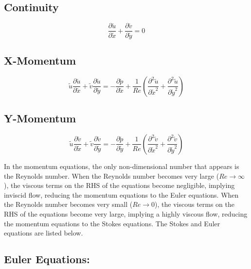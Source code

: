 \documentclass[11pt]{article}
\begin{document}
\subsection*{Continuity}
\begin{equation*}
    \frac{\partial \tilde{u}}{\partial \tilde{x}} + \frac{\partial \tilde{v}}{\partial \tilde{y}} = 0
\end{equation*}

\subsection*{X-Momentum}
\begin{equation*}
    \tilde{u} \frac{\partial \tilde{u}}{\partial \tilde{x}} + \tilde{v} \frac{\partial \tilde{u}}{\partial \tilde{y}} = -\frac{\partial \tilde{p}}{\partial \tilde{x}} + \frac{1}{Re}\left(\frac{\partial^2 \tilde{u}}{\partial \tilde{x}^2} + \frac{\partial^2 \tilde{u}}{\partial \tilde{y}^2}\right)
\end{equation*}

\subsection*{Y-Momentum}
\begin{equation*}
    \tilde{u} \frac{\partial \tilde{v}}{\partial \tilde{x}} + \tilde{v} \frac{\partial \tilde{v}}{\partial \tilde{y}} = -\frac{\partial \tilde{p}}{\partial \tilde{y}} + \frac{1}{Re}\left(\frac{\partial^2 \tilde{v}}{\partial \tilde{x}^2} + \frac{\partial^2 \tilde{v}}{\partial \tilde{y}^2}\right)
\end{equation*}
\vspace{2.5mm} 

In the momentum equations, the only non-dimensional number that appears is the Reynolds number. When the Reynolds number becomes very large ($Re \rightarrow \infty$), the viscous terms on the RHS of the equations become negligible, implying inviscid flow, reducing the momentum equations to the Euler equations. When the Reynolds number becomes very small ($Re \rightarrow 0$), the viscous terms on the RHS of the equations become very large, implying a highly viscous flow, reducing the momentum equations to the Stokes equations. The Stokes and Euler equations are listed below. 
\vspace{5mm}

\subsection*{Euler Equations:}
\end{document}
